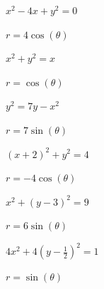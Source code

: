 \documentclass{ximera}
\begin{document}
\begin{question}
\begin{problem}
$x^2 -4x + y^2 = 0$

\begin{solution}
$r = 4\cos(\theta)$
\end{solution}
\end{problem}

\begin{problem}
$x^2 + y^2 = x$

\begin{solution}
$r = \cos(\theta)$
\end{solution}
\end{problem}

\begin{problem}
$y^2 = 7y - x^2$

\begin{solution}
$r = 7\sin(\theta)$
\end{solution}
\end{problem}

\begin{problem}
$(x+2)^2 + y^2 = 4$

\begin{solution}
$r= -4\cos(\theta)$
\end{solution}
\end{problem}

\begin{problem}
$x^{2} + (y - 3)^{2} = 9$

\begin{solution}
$r = 6\sin(\theta)$
\end{solution}
\end{problem}

\begin{problem}\label{equrecttopolarlast}
$4x^2 + 4\left( y - \frac{1}{2} \right)^2 = 1$

\begin{solution}
$r = \sin(\theta)$
\end{solution}
\end{problem}

\end{question}
\end{document}
